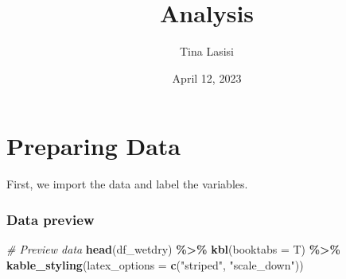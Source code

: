 \documentclass[
]{article}
\title{Analysis}
\author{Tina Lasisi}
\date{April 12, 2023}
\newenvironment{Shaded}{\begin{snugshade}}{\end{snugshade}}
\newcommand{\AttributeTok}[1]{\textcolor[rgb]{0.13,0.29,0.53}{#1}}
\newcommand{\CommentTok}[1]{\textcolor[rgb]{0.56,0.35,0.01}{\textit{#1}}}
\newcommand{\FunctionTok}[1]{\textcolor[rgb]{0.13,0.29,0.53}{\textbf{#1}}}
\newcommand{\NormalTok}[1]{#1}
\newcommand{\SpecialCharTok}[1]{\textcolor[rgb]{0.81,0.36,0.00}{\textbf{#1}}}
\newcommand{\StringTok}[1]{\textcolor[rgb]{0.31,0.60,0.02}{#1}}
\begin{document}
\maketitle

\hypertarget{preparing-data}{%
\section{Preparing Data}\label{preparing-data}}

First, we import the data and label the variables.

\hypertarget{data-preview}{%
\subsubsection{Data preview}\label{data-preview}}

\begin{Shaded}
\begin{Highlighting}[]
\CommentTok{\# Preview data}
\FunctionTok{head}\NormalTok{(df\_wetdry) }\SpecialCharTok{\%\textgreater{}\%}
    \FunctionTok{kbl}\NormalTok{(}\AttributeTok{booktabs =}\NormalTok{ T) }\SpecialCharTok{\%\textgreater{}\%}
    \FunctionTok{kable\_styling}\NormalTok{(}\AttributeTok{latex\_options =} \FunctionTok{c}\NormalTok{(}\StringTok{"striped"}\NormalTok{, }\StringTok{"scale\_down"}\NormalTok{))}
\end{Highlighting}
\end{Shaded}
\end{document}
